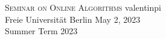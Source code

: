 \documentclass[10pt]{amsart}
\theoremstyle{definition}
\theoremstyle{remark}
\begin{document}



    \begin{mdframed}
        \textsc{Seminar on Online Algorithms} \hfill valentinpi\\
        Freie Universität Berlin \hfill May 2, 2023\\
        Summer Term 2023
    \end{mdframed}
\end{document}
